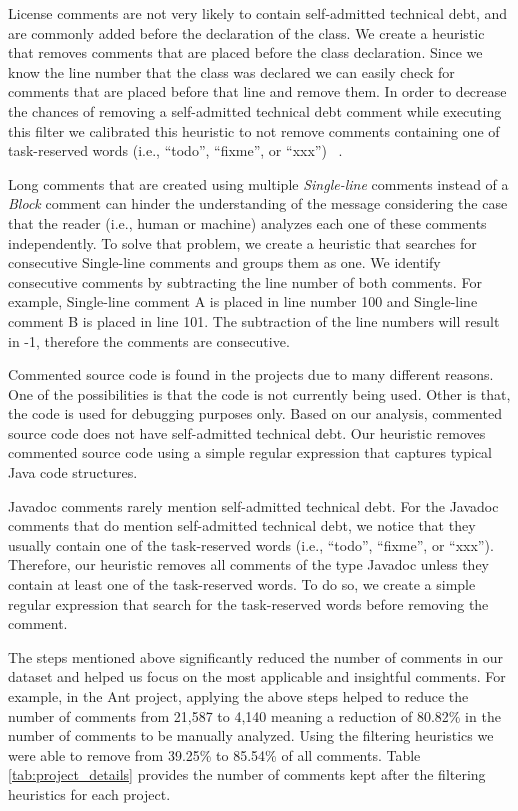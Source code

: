 License comments are not very likely to contain self-admitted technical debt, and are commonly added before the declaration of the class. We create a heuristic that removes comments that are placed before the class declaration. Since we know the line number that the class was declared we can easily check for comments that are placed before that line and remove them. In order to decrease the chances of removing a self-admitted technical debt comment while executing this filter we calibrated this heuristic to not remove comments containing one of task-reserved words (i.e., ``todo'', ``fixme'', or ``xxx'') ~\cite{Storey2008ICSE}.

Long comments that are created using multiple \emph{Single-line} comments instead of a \emph{Block} comment can hinder the understanding of the message considering the case that the reader (i.e., human or machine) analyzes each one of these comments independently. To solve that problem, we create a heuristic that searches for consecutive Single-line comments and groups them as one. We identify consecutive comments by subtracting the line number of both comments. For example, Single-line comment A is placed in line number 100 and Single-line comment B is placed in line 101. The subtraction of the line numbers will result in -1, therefore the comments are consecutive.
 
Commented source code is found in the projects due to many different reasons. One of the possibilities is that the code is not currently being used. Other is that, the code is used for debugging purposes only. Based on our analysis, commented source code does not have self-admitted technical debt. Our heuristic removes commented source code using a simple regular expression that captures typical Java code structures.

Javadoc comments rarely mention self-admitted technical debt. For the Javadoc comments that do mention self-admitted technical debt, we notice that they usually contain one of the task-reserved words (i.e., ``todo'', ``fixme'', or ``xxx''). Therefore, our heuristic removes all comments of the type Javadoc unless they contain at least one of the task-reserved words. To do so, we create a simple regular expression that search for the task-reserved words before removing the comment.  

The steps mentioned above significantly reduced the number of comments in our dataset and helped us focus on the most applicable and insightful comments. For example, in the Ant project, applying the above steps helped to reduce the number of comments from 21,587 to 4,140 meaning a reduction of 80.82\% in the number of comments to be manually analyzed. Using the filtering heuristics we were able to remove from 39.25\% to 85.54\% of all comments. Table \ref{tab:project_details} provides the number of comments kept after the filtering heuristics for each project.

